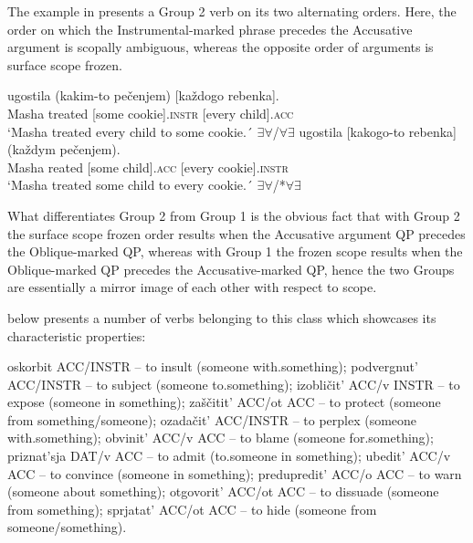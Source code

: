 \documentclass[output=paper,colorlinks,citecolor=brown,nonflat]{./langscibook}
\begin{document}
The example in  presents a Group 2 verb on its two alternating orders. Here, the order on which the Instrumental-marked phrase precedes the Accusative argument is scopally ambiguous, whereas the opposite order of arguments is surface scope frozen.


\ea%
    \label{ex:antonyuk:15}
    \ea \label{ex:antonyuk:15a}
       {ugostila} {(kakim-to} {pečenjem)}  {[každogo} {rebenka]}.\\
    Masha treated  [some        cookie].\textsc{instr} [every child].\textsc{acc}\\
    \glt `Masha treated every child to some cookie.´ \hfill ${\exists}{\forall}$/${\forall}{\exists}$
    \ex \label{ex:antonyuk:15b}
       {ugostila} {[kakogo-to} {rebenka]}    {(každym} {pečenjem)}.\\
    Masha reated    [some child].\textsc{acc} [every    cookie].\textsc{instr}\\
    \glt `Masha treated some child to every cookie.´ \hfill ${\exists}{\forall}$/*${\forall}{\exists}$
    \z
\z

What differentiates Group 2 from Group 1 is the obvious fact that with Group 2 the surface scope frozen order results when the Accusative argument QP precedes the Oblique-marked QP, whereas with Group 1 the frozen scope results when the Oblique-marked QP precedes the Accusative-marked QP, hence the two Groups are essentially a mirror image of each other with respect to scope.

 below presents a number of verbs belonging to this class which showcases its characteristic properties:

\ea%
    \label{ex:antonyuk:16}
    \ea \label{ex:antonyuk:16a}
    oskorbit ACC/INSTR – to insult (someone with.something);
    \ex \label{ex:antonyuk:16b}
    podvergnut’ ACC/INSTR – to subject (someone to.something);
    \ex \label{ex:antonyuk:16c}
    izobličit’ ACC/v INSTR – to expose (someone in something);
    \ex \label{ex:antonyuk:16d}
    zaščitit’ ACC/ot ACC – to protect (someone from something/someone);
    \ex \label{ex:antonyuk:16e}
    ozadačit’ ACC/INSTR – to perplex (someone with.something);
    \ex \label{ex:antonyuk:16f}
    obvinit’ ACC/v ACC – to blame (someone for.something);
    \ex \label{ex:antonyuk:16g}
    priznat’sja DAT/v ACC – to admit (to.someone in something);
    \ex \label{ex:antonyuk:16h}
    ubedit’ ACC/v ACC – to convince (someone in something);
    \ex \label{ex:antonyuk:16i}
    predupredit’ ACC/o ACC – to warn (someone about something);
    \ex \label{ex:antonyuk:16j}
    otgovorit’ ACC/ot ACC – to dissuade (someone from something);
    \ex \label{ex:antonyuk:16k}
    sprjatat’ ACC/ot ACC – to hide (someone from someone/something).
    \z
\z
\end{document}

